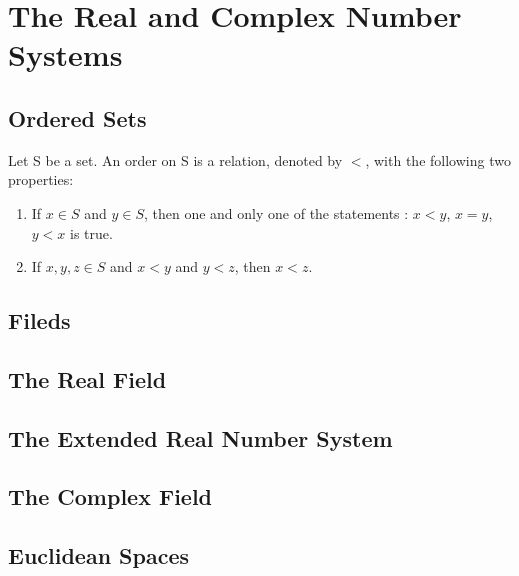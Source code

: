 \chapter{The Real and Complex Number Systems}

\section{Ordered Sets}
\begin{definition}
  Let S be a set. An order on S is a relation, denoted by $<$, with the
  following two properties:
  \begin{enumerate}
    \item If $x \in S$ and $y \in S$, then one and only one of the
      statements : $x < y$, $x = y$, $y < x$ is true.
    \item If $x, y, z \in S$ and $x < y$ and $y < z$, then $x < z$.
  \end{enumerate}


  \label{def:ordered_set}
\end{definition}

\section{Fileds}

\section{The Real Field}

\section{The Extended Real Number System}

\section{The Complex Field}

\section{Euclidean Spaces}




